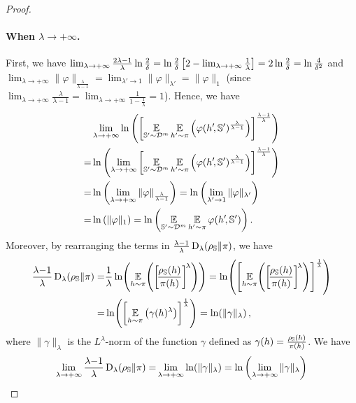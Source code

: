 \begin{noaddcontents}
\begin{proof}
\paragraph{When \mbox{$\lambda\rightarrow +\infty$}.} First, we have  
$\lim_{\lambda\rightarrow+\infty}{\frac{2\lambda{-}1}{\lambda}}\ln\frac{2}{\delta} = \ln\frac{2}{\delta}\left[2 -\lim_{\lambda\rightarrow+\infty}\frac{1}{\lambda} \right] = 2\ln\frac{2}{\delta}= \ln\frac{4}{\delta^2}$ and $\lim_{\lambda\rightarrow +\infty} \|\varphi\|_{\frac{\lambda}{\lambda{-}1}} = \lim_{\lambda'\rightarrow 1} \|\varphi\|_{\lambda'} = \|\varphi\|_1$ (since $\lim_{\lambda\rightarrow +\infty}\frac{\lambda}{\lambda-1}\!= \lim_{\lambda\rightarrow +\infty} \frac{1}{1-\frac{1}{\lambda}}=1$).
Hence, we have 
\begin{align*}
    &\lim_{\lambda\rightarrow+\infty} \ln\left(\left[\operatorname*{\mathbb{E}}_{\mathbb{S}'{\sim}\mathcal{D}^{m}}\operatorname*{\mathbb{E}}_{h'{\sim}\pi}\left(\varphi(h'\!, \mathbb{S}')^{\frac{\lambda}{\lambda{-}1}}\right)\right]^{\frac{\lambda{-}1}{\lambda}}\right)\\
    = &\ln\left( \lim_{\lambda\rightarrow+\infty} \left[\operatorname*{\mathbb{E}}_{\mathbb{S}'{\sim}\mathcal{D}^{m}}\operatorname*{\mathbb{E}}_{h'{\sim}\pi}\left(\varphi(h'\!, \mathbb{S}')^{\frac{\lambda}{\lambda{-}1}}\right)\right]^{\frac{\lambda{-}1}{\lambda}}\right)\\
    = &\ln\left( \lim_{\lambda\rightarrow+\infty} \| \varphi\|_{\frac{\lambda}{\lambda-1}}\right) = \ln\left( \lim_{\lambda'\rightarrow1} \| \varphi\|_{\lambda'}\right)\\
    = &\ln\left( \| \varphi\|_{1}\right) = \ln\left( \operatorname*{\mathbb{E}}_{\mathbb{S}'{\sim}\mathcal{D}^{m}}\operatorname*{\mathbb{E}}_{h'{\sim}\pi}\varphi(h'\!, \mathbb{S}') \right).
\end{align*}
Moreover, by rearranging the terms in $\frac{\lambda{-}1}{\lambda}\operatorname{D}_{\lambda}(\rho_{\mathbb{S}}\|\pi)$, we have
\begin{align*}
\frac{\lambda{-}1}{\lambda}\Renyi_{\lambda}(\AQ\|\P) = &\frac{1}{\lambda}\ln\!\LP \EE_{\h{\sim}\P}\!\LP\LB\!\frac{ \AQ(\h)}{\P(\h)}\RB^{\!\lambda}\RP\RP = \ln\!\LP \LB\EE_{\h{\sim}\P}\!\LP\LB\!\frac{ \AQ(\h)}{\P(\h)}\RB^{\!\lambda}\RP\RB^{\frac{1}{\lambda}}\RP\\
= &\ln\!\LP \LB\EE_{\h{\sim}\P}\LP\gamma(\h)^{\lambda}\RP\RB^{\frac{1}{\lambda}}\RP = \ln\!\LP \| \gamma\|_{\lambda}\RP,
\end{align*}
where $\| \gamma\|_{\lambda}$ is the $L^{\lambda}$-norm of the function $\gamma$ defined as $\gamma(h)=\tfrac{\rho_{\mathbb{S}}(h)}{\pi(h)}$.
We have
\begin{align*}
    \lim_{\lambda\rightarrow +\infty}  \frac{\lambda{-}1}{\lambda}\Renyi_{\lambda}(\AQ\|\P) =& \lim_{\lambda\rightarrow +\infty}  \ln\!\LP \| \gamma\|_{\lambda}\RP = \ln\LP\lim_{\lambda\rightarrow +\infty} \|\gamma\|_{\lambda}\RP\\

\end{align*}
\end{proof}
\end{noaddcontents}

